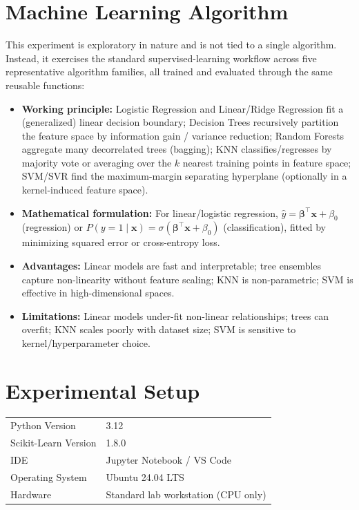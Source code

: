 \documentclass[12pt,a4paper]{article}
\newenvironment{fitwidth}
  {\begin{lrbox}{\fitbox}}
  {\end{lrbox}\ifdim\wd\fitbox>\linewidth\resizebox{\linewidth}{!}{\usebox{\fitbox}}\else\usebox{\fitbox}\fi}
\DeclareRobustCommand{\_}{\textunderscore\allowbreak}
\begin{document}
\section{Machine Learning Algorithm}
This experiment is exploratory in nature and is not tied to a single algorithm.
Instead, it exercises the standard supervised-learning workflow across five
representative algorithm families, all trained and evaluated through the same
reusable functions:
\begin{itemize}
\item \textbf{Working principle:} Logistic Regression and Linear/Ridge Regression
fit a (generalized) linear decision boundary; Decision Trees recursively partition
the feature space by information gain / variance reduction; Random Forests
aggregate many decorrelated trees (bagging); KNN classifies/regresses by majority
vote or averaging over the $k$ nearest training points in feature space; SVM/SVR
find the maximum-margin separating hyperplane (optionally in a kernel-induced
feature space).
\item \textbf{Mathematical formulation:} For linear/logistic regression,
$\hat{y}=\boldsymbol\beta^\top \mathbf{x}+\beta_0$ (regression) or
$P(y=1\mid \mathbf{x})=\sigma(\boldsymbol\beta^\top \mathbf{x}+\beta_0)$
(classification), fitted by minimizing squared error or cross-entropy loss.
\item \textbf{Advantages:} Linear models are fast and interpretable; tree
ensembles capture non-linearity without feature scaling; KNN is non-parametric;
SVM is effective in high-dimensional spaces.
\item \textbf{Limitations:} Linear models under-fit non-linear relationships;
trees can overfit; KNN scales poorly with dataset size; SVM is sensitive to
kernel/hyperparameter choice.
\end{itemize}

\section{Experimental Setup}
\begin{center}
\begin{minipage}{\linewidth}\centering
\begin{fitwidth}
\begin{tabular}{ll}
\toprule
Python Version & 3.12 \\
Scikit-Learn Version & 1.8.0 \\
IDE & Jupyter Notebook / VS Code \\
Operating System & Ubuntu 24.04 LTS \\
Hardware & Standard lab workstation (CPU only) \\
\bottomrule
\end{tabular}
\end{fitwidth}
\end{minipage}
\end{center}
\end{document}
